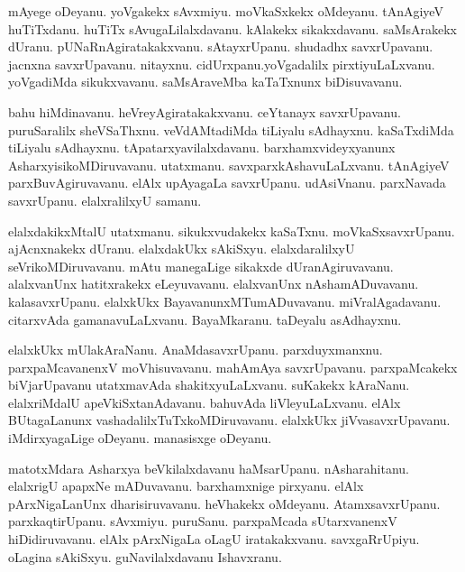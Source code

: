 \documentclass{article}
\begin{document}
\begin{mn}%
mAyege oDeyanu. yoVgakekx sAvxmiyu. moVkaSxkekx oMdeyanu. tAnAgiyeV huTiTxdanu. huTiTx 
sAvugaLilalxdavanu. kAlakekx sikakxdavanu. saMsArakekx dUranu. pUNaRnAgiratakakxvanu. 
sAtayxrUpanu. shudadhx savxrUpavanu. jacnxna savxrUpavanu. nitayxnu. cidUrxpanu.yoVgadalilx 
pirxtiyuLaLxvanu. yoVgadiMda sikukxvavanu. saMsAraveMba kaTaTxnunx biDisuvavanu.
\end{mn}

\begin{mn}%
bahu hiMdinavanu. heVreyAgiratakakxvanu. ceYtanayx savxrUpavanu. puruSaralilx sheVSaThxnu. 
veVdAMtadiMda tiLiyalu sAdhayxnu. kaSaTxdiMda tiLiyalu sAdhayxnu. tApatarxyavilalxdavanu. 
barxhamxvideyxyanunx AsharxyisikoMDiruvavanu. utatxmanu. savxparxkAshavuLaLxvanu. tAnAgiyeV 
parxBuvAgiruvavanu. elAlx upAyagaLa savxrUpanu. udAsiVnanu. parxNavada savxrUpanu. elalxralilxyU 
samanu.
\end{mn}

\begin{mn}%
elalxdakikxMtalU utatxmanu. sikukxvudakekx kaSaTxnu. moVkaSxsavxrUpanu. ajAcnxnakekx dUranu. 
elalxdakUkx sAkiSxyu. elalxdaralilxyU seVrikoMDiruvavanu. mAtu manegaLige sikakxde 
dUranAgiruvavanu. alalxvanUnx hatitxrakekx eLeyuvavanu. elalxvanUnx nAshamADuvavanu. 
kalasavxrUpanu. elalxkUkx BayavanunxMTumADuvavanu. miVralAgadavanu. citarxvAda gamanavuLaLxvanu. 
BayaMkaranu. taDeyalu asAdhayxnu.
\end{mn}

\begin{mn}%
elalxkUkx mUlakAraNanu. AnaMdasavxrUpanu. parxduyxmanxnu. parxpaMcavanenxV moVhisuvavanu. mahAmAya 
savxrUpavanu. parxpaMcakekx biVjarUpavanu utatxmavAda shakitxyuLaLxvanu. suKakekx kAraNanu. 
elalxriMdalU apeVkiSxtanAdavanu. bahuvAda liVleyuLaLxvanu. elAlx BUtagaLanunx 
vashadalilxTuTxkoMDiruvavanu. elalxkUkx jiVvasavxrUpavanu. iMdirxyagaLige oDeyanu. manasisxge 
oDeyanu.
\end{mn}

\begin{mn}%
matotxMdara Asharxya beVkilalxdavanu haMsarUpanu. nAsharahitanu. elalxrigU apapxNe mADuvavanu. 
barxhamxnige pirxyanu. elAlx pArxNigaLanUnx dharisiruvavanu. heVhakekx oMdeyanu. AtamxsavxrUpanu. 
parxkaqtirUpanu. sAvxmiyu. puruSanu. parxpaMcada sUtarxvanenxV hiDidiruvavanu. elAlx pArxNigaLa 
oLagU iratakakxvanu. savxgaRrUpiyu. oLagina sAkiSxyu. guNavilalxdavanu Ishavxranu.
\end{mn}
\end{document}
